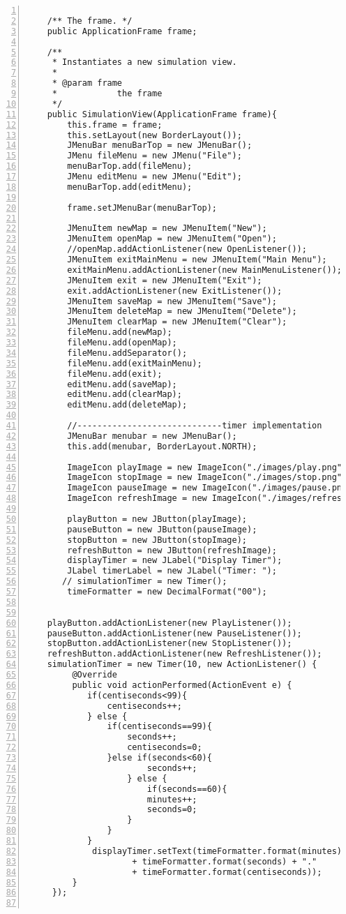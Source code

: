 \begin{lstlisting}[numbers=left, numberstyle=\small, numbersep=8pt,  framexleftmargin=1pt, framexrightmargin=10pt ]
	
	/** The frame. */
	public ApplicationFrame frame;
	
	/**
	 * Instantiates a new simulation view.
	 *
	 * @param frame
	 *            the frame
	 */
	public SimulationView(ApplicationFrame frame){
		this.frame = frame;
		this.setLayout(new BorderLayout());
		JMenuBar menuBarTop = new JMenuBar();
		JMenu fileMenu = new JMenu("File");
	    menuBarTop.add(fileMenu);
	    JMenu editMenu = new JMenu("Edit");
	    menuBarTop.add(editMenu);
	    
	    frame.setJMenuBar(menuBarTop);
	    
	    JMenuItem newMap = new JMenuItem("New");
	    JMenuItem openMap = new JMenuItem("Open");
	    //openMap.addActionListener(new OpenListener());
	    JMenuItem exitMainMenu = new JMenuItem("Main Menu");
	    exitMainMenu.addActionListener(new MainMenuListener());
	    JMenuItem exit = new JMenuItem("Exit");
	    exit.addActionListener(new ExitListener());
        JMenuItem saveMap = new JMenuItem("Save");
        JMenuItem deleteMap = new JMenuItem("Delete");
        JMenuItem clearMap = new JMenuItem("Clear");
        fileMenu.add(newMap);
        fileMenu.add(openMap);
        fileMenu.addSeparator();
        fileMenu.add(exitMainMenu);
        fileMenu.add(exit);
        editMenu.add(saveMap);
        editMenu.add(clearMap);
        editMenu.add(deleteMap);
     
        //-----------------------------timer implementation
		JMenuBar menubar = new JMenuBar();
	    this.add(menubar, BorderLayout.NORTH);
	    
	    ImageIcon playImage = new ImageIcon("./images/play.png");
		ImageIcon stopImage = new ImageIcon("./images/stop.png");
		ImageIcon pauseImage = new ImageIcon("./images/pause.png");
		ImageIcon refreshImage = new ImageIcon("./images/refresh.jpg");
		
		playButton = new JButton(playImage);
		pauseButton = new JButton(pauseImage);
		stopButton = new JButton(stopImage);	
		refreshButton = new JButton(refreshImage);
		displayTimer = new JLabel("Display Timer");
	    JLabel timerLabel = new JLabel("Timer: ");
	   // simulationTimer = new Timer();
	    timeFormatter = new DecimalFormat("00");
	    
        
	playButton.addActionListener(new PlayListener());
	pauseButton.addActionListener(new PauseListener());
	stopButton.addActionListener(new StopListener());
	refreshButton.addActionListener(new RefreshListener());
	simulationTimer = new Timer(10, new ActionListener() {
         @Override
         public void actionPerformed(ActionEvent e) {
         	if(centiseconds<99){	
         		centiseconds++;
         	} else {
         		if(centiseconds==99){
         			seconds++;
         			centiseconds=0; 
         		}else if(seconds<60){
         				seconds++;
         			} else {
         				if(seconds==60){
         				minutes++;
         				seconds=0;
         			}
         		}
         	}
             displayTimer.setText(timeFormatter.format(minutes) + ":"
                     + timeFormatter.format(seconds) + "."
                     + timeFormatter.format(centiseconds));
         }
     });


\end{lstlisting}
